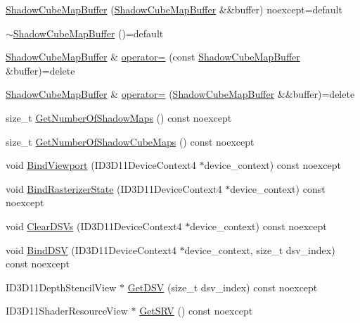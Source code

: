 \begin{DoxyCompactItemize}
\item 
\hyperlink{structmage_1_1_shadow_cube_map_buffer_abd70f932d354f9922e311330e0c2bcd8}{Shadow\+Cube\+Map\+Buffer} (\hyperlink{structmage_1_1_shadow_cube_map_buffer}{Shadow\+Cube\+Map\+Buffer} \&\&buffer) noexcept=default
\item 
\hyperlink{structmage_1_1_shadow_cube_map_buffer_ad84dab42c8391819f93f9e60acd4655d}{$\sim$\+Shadow\+Cube\+Map\+Buffer} ()=default
\item 
\hyperlink{structmage_1_1_shadow_cube_map_buffer}{Shadow\+Cube\+Map\+Buffer} \& \hyperlink{structmage_1_1_shadow_cube_map_buffer_abdb46d337840a5ffd76f12472d520eff}{operator=} (const \hyperlink{structmage_1_1_shadow_cube_map_buffer}{Shadow\+Cube\+Map\+Buffer} \&buffer)=delete
\item 
\hyperlink{structmage_1_1_shadow_cube_map_buffer}{Shadow\+Cube\+Map\+Buffer} \& \hyperlink{structmage_1_1_shadow_cube_map_buffer_aebf8e9d2e0a2ec5bf13dc40b93f97fde}{operator=} (\hyperlink{structmage_1_1_shadow_cube_map_buffer}{Shadow\+Cube\+Map\+Buffer} \&\&buffer)=delete
\item 
size\+\_\+t \hyperlink{structmage_1_1_shadow_cube_map_buffer_a90dd93ff618bc56750bd08cfe6979c23}{Get\+Number\+Of\+Shadow\+Maps} () const noexcept
\item 
size\+\_\+t \hyperlink{structmage_1_1_shadow_cube_map_buffer_ab6832adb714a9685972ece7c410b38ad}{Get\+Number\+Of\+Shadow\+Cube\+Maps} () const noexcept
\item 
void \hyperlink{structmage_1_1_shadow_cube_map_buffer_a0d3c49ed2d07dbe9d3e7efcc17416a70}{Bind\+Viewport} (I\+D3\+D11\+Device\+Context4 $\ast$device\+\_\+context) const noexcept
\item 
void \hyperlink{structmage_1_1_shadow_cube_map_buffer_ad47c740ba2246f965fb2021186bd11b8}{Bind\+Rasterizer\+State} (I\+D3\+D11\+Device\+Context4 $\ast$device\+\_\+context) const noexcept
\item 
void \hyperlink{structmage_1_1_shadow_cube_map_buffer_a5ffb09d2ad4ee49497d8d374614950bb}{Clear\+D\+S\+Vs} (I\+D3\+D11\+Device\+Context4 $\ast$device\+\_\+context) const noexcept
\item 
void \hyperlink{structmage_1_1_shadow_cube_map_buffer_a6c970efc7fda17010f5e59923e7651e2}{Bind\+D\+SV} (I\+D3\+D11\+Device\+Context4 $\ast$device\+\_\+context, size\+\_\+t dsv\+\_\+index) const noexcept
\item 
I\+D3\+D11\+Depth\+Stencil\+View $\ast$ \hyperlink{structmage_1_1_shadow_cube_map_buffer_a1db641015a14c177b4c504b85905060a}{Get\+D\+SV} (size\+\_\+t dsv\+\_\+index) const noexcept
\item 
I\+D3\+D11\+Shader\+Resource\+View $\ast$ \hyperlink{structmage_1_1_shadow_cube_map_buffer_ae1a6d1a26d482d6d145505b3b63bdb8d}{Get\+S\+RV} () const noexcept
\end{DoxyCompactItemize}
